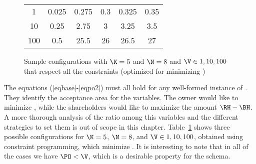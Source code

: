 \begin{figure}[t]
	\centering
	\begin{tabular}[b]{| c | c | c | c | c | c |}	
		\hline
		\V & \Wshare & \BH & \RH & \Wsecret & \PO \\
		\hline \hline
		1 & 0.025 &  0.275 &  0.3 &  0.325 &  0.35 \\
   		\hline \hline
		10 & 0.25  &  2.75  &  3   &  3.25  &  3.5  \\
   		\hline \hline
		100 & 0.5   & 25.5   & 26   & 26.5   & 27    \\
		\hline
	\end{tabular}
	\caption{Sample configurations with $\K=5$ and $\N=8$ and $\V \in {1,10,100}$ that respect all the constraints (optimized for minimizing \PO)}
	\label{table:variables}	
\end{figure} 

The equations (\ref{eqbase}-\ref{eqpo2}) must all hold for any well-formed instance of \shortname. They identify the acceptance area for the variables. The owner would like to minimize \PO, while the shareholders would like to maximize the amount $\RH - \BH$.
A more thorough analysis of the ratio among this variables and the different strategies to set them is out of scope in this chapter.
Table~\ref{table:variables} shows three possible configurations for $\K=5$, $\N=8$, and $\V \in {1, 10, 100}$, obtained using constraint programming, which minimize \PO.
It is interesting to note that in all of the cases we have $\PO < \V$, which is a desirable property for the schema.


